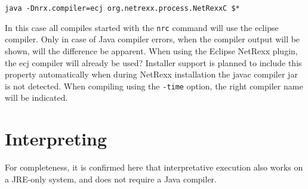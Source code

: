 \begin{verbatim}
java -Dnrx.compiler=ecj org.netrexx.process.NetRexxC $*
\end{verbatim}
 
In this case all compiles started with the \texttt{nrc} command will use the eclipse compiler. Only in case of Java compiler errors, when the compiler output will be shown, will the difference be apparent. When using the Eclipse NetRexx plugin, the ecj compiler will already be used? Installer support is planned to include this property automatically when during NetRexx installation the javac compiler jar is not detected. When compiling using the \texttt{-time} option, the right compiler name will be indicated.
 
\section{Interpreting}
For completeness, it is confirmed here that interpretative execution also works on a JRE-only system, and does not require a Java compiler.
 